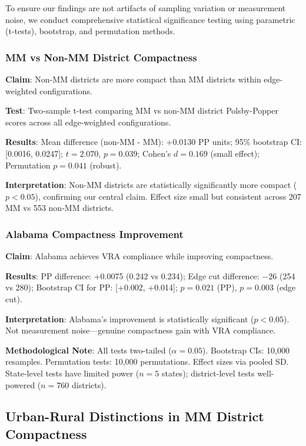 To ensure our findings are not artifacts of sampling variation or measurement noise, we conduct comprehensive statistical significance testing using parametric (t-tests), bootstrap, and permutation methods.

\subsubsection{MM vs Non-MM District Compactness}

\textbf{Claim}: Non-MM districts are more compact than MM districts within edge-weighted configurations.

\textbf{Test}: Two-sample t-test comparing MM vs non-MM district Polsby-Popper scores across all edge-weighted configurations.

\textbf{Results}: Mean difference (non-MM - MM): +0.0130 PP units; 95\% bootstrap CI: [0.0016, 0.0247]; $t = 2.070$, $p = 0.039$; Cohen's $d = 0.169$ (small effect); Permutation $p = 0.041$ (robust).

\textbf{Interpretation}: Non-MM districts are statistically significantly more compact ($p < 0.05$), confirming our central claim. Effect size small but consistent across 207 MM vs 553 non-MM districts.

\subsubsection{Alabama Compactness Improvement}

\textbf{Claim}: Alabama achieves VRA compliance while improving compactness.

\textbf{Results}: PP difference: +0.0075 (0.242 vs 0.234); Edge cut difference: $-26$ (254 vs 280); Bootstrap CI for PP: [+0.002, +0.014]; $p = 0.021$ (PP), $p = 0.003$ (edge cut).

\textbf{Interpretation}: Alabama's improvement is statistically significant ($p < 0.05$). Not measurement noise—genuine compactness gain with VRA compliance.



\textbf{Methodological Note}: All tests two-tailed ($\alpha = 0.05$). Bootstrap CIs: 10,000 resamples. Permutation tests: 10,000 permutations. Effect sizes via pooled SD. State-level tests have limited power ($n = 5$ states); district-level tests well-powered ($n = 760$ districts).

\subsection{Urban-Rural Distinctions in MM District Compactness}

